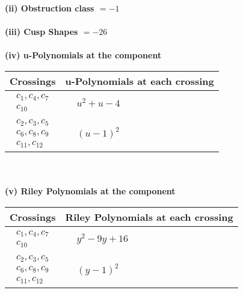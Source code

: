 \documentclass[1p]{elsarticle_modified}
\theoremstyle{definition}
\begin{document}
\flushleft \textbf{(ii) Obstruction class $= -1$}\\~\\
\flushleft \textbf{(iii) Cusp Shapes $= -26$}\\~\\
\newpage\renewcommand{\arraystretch}{1}
\flushleft \textbf{(iv) u-Polynomials at the component}\newline \\
\begin{tabular}{m{50pt}|m{274pt}}
Crossings & \hspace{64pt}u-Polynomials at each crossing \\
\hline $$\begin{aligned}c_{1},c_{4},c_{7}\\c_{10}\end{aligned}$$&$\begin{aligned}
&u^2+u-4
\end{aligned}$\\
\hline $$\begin{aligned}c_{2},c_{3},c_{5}\\c_{6},c_{8},c_{9}\\c_{11},c_{12}\end{aligned}$$&$\begin{aligned}
&(u-1)^2
\end{aligned}$\\
\hline
\end{tabular}\\~\\
\newpage\renewcommand{\arraystretch}{1}
\flushleft \textbf{(v) Riley Polynomials at the component}\newline \\
\begin{tabular}{m{50pt}|m{274pt}}
Crossings & \hspace{64pt}Riley Polynomials at each crossing \\
\hline $$\begin{aligned}c_{1},c_{4},c_{7}\\c_{10}\end{aligned}$$&$\begin{aligned}
&y^2-9 y+16
\end{aligned}$\\
\hline $$\begin{aligned}c_{2},c_{3},c_{5}\\c_{6},c_{8},c_{9}\\c_{11},c_{12}\end{aligned}$$&$\begin{aligned}
&(y-1)^2
\end{aligned}$\\
\hline
\end{tabular}\\~\\
\end{document}
